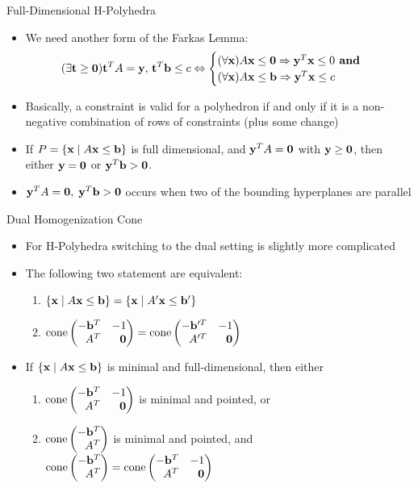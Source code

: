 \documentclass{beamer}
\begin{document}
\begin{frame}{Full-Dimensional H-Polyhedra}
\begin{itemize}
  \item<1-> We need another form of the Farkas Lemma:
      \[ (\exists \mathbf{t}\geq\mathbf{0}) \mathbf{t}^T A = \mathbf{y},\, \mathbf{t}^T\mathbf{b} \leq c \Leftrightarrow
        \begin{cases}
        (\forall \mathbf{x}) A\mathbf{x}\leq \mathbf{0} \Rightarrow \mathbf{y}^T\mathbf{x} \leq 0 \textbf{ and } \\
        (\forall \mathbf{x}) A\mathbf{x}\leq \mathbf{b} \Rightarrow \mathbf{y}^T\mathbf{x} \leq c
        \end{cases}
      \]
  \item<2-> Basically, a constraint is valid for a polyhedron if and only if it is a non-negative combination of rows of constraints (plus some change)
  \item<3-> If $P = \left\{\mathbf{x}\;|\; A\mathbf{x}\leq \mathbf{b}\right\}$ is full dimensional, and $\mathbf{y}^T A = \mathbf{0}$ with $\mathbf{y}\geq\mathbf{0}$, then either $\mathbf{y} = \mathbf{0}$ or $\mathbf{y}^T \mathbf{b} > \mathbf{0}$.
  \item<4-> $\mathbf{y}^T A = \mathbf{0},\;\mathbf{y}^T \mathbf{b} > \mathbf{0}$ occurs when two of the bounding hyperplanes are parallel
\end{itemize}
\end{frame}

\begin{frame}{Dual Homogenization Cone}
\begin{itemize}
  \item<1-> For H-Polyhedra switching to the dual setting is slightly more complicated
  \item<2-> 	The following two statement are equivalent:
    \begin{enumerate}
      \item $\left\{\mathbf{x}\;|\; A\mathbf{x}\leq \mathbf{b}\right\} = \left\{\mathbf{x}\;|\; A'\mathbf{x}\leq \mathbf{b}'\right\}$
      \item $\cone \pmb -\vec{b}^T & -1 \\ A^T & \0 \pme = \cone \pmb -\vec{b}'^T & -1 \\ A'^T & \0 \pme$
    \end{enumerate}
  \item<3-> If $\left\{\mathbf{x}\;|\; A\mathbf{x}\leq \mathbf{b}\right\}$ is minimal and full-dimensional, then either 
    \begin{enumerate}
      \item $\cone \pmb -\vec{b}^T & -1 \\ A^T & \0 \pme$ is minimal and pointed, or
      \item $\cone \pmb -\vec{b}^T \\ A^T \pme$ is minimal and pointed, and $\cone\pmb -\vec{b}^T \\ A^T \pme = \cone \pmb -\vec{b}^T & -1 \\ A^T & \0 \pme$
    \end{enumerate}
\end{itemize}
\end{frame}
\end{document}
